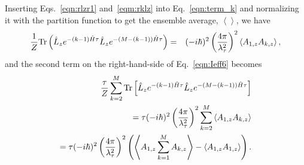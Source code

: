 \documentclass[12pt]{iopart}
\begin{document}
Inserting Eqs.~\ref{eqn:rlzr1} and~\ref{eqm:rklz} into Eq.~\ref{eqn:term_k} and normalizing it with the partition function to get the ensemble average,  $\left< \right>$, we have
\begin{eqnarray}
\frac{1}{Z}{\rm Tr}\left( \hat{L}_ze^{-(k-1)\hat{H}\tau}\hat{L}_ze^{-(M-(k-1))\hat{H}\tau} \right)&=&(-i\hbar)^2\left( \frac{4\pi}{\lambda_\tau^2} \right)^2\left< A_{1,z}A_{k,z} \right>,
\end{eqnarray}
and the second term on the right-hand-side of Eq.~\ref{eqn:Ieff6} becomes
\begin{eqnarray}
\frac{\tau}{Z}\sum_{k=2}^M{\rm Tr}\left[ \hat{L}_ze^{-(k-1)\hat{H}\tau}\hat{L}_z 
e^{-(M-(k-1))\hat{H}\tau} \right]
\nonumber\\
=\tau(-i\hbar)^2\left(\frac{4\pi}{\lambda_\tau^2} \right)^2\sum_{k=2}^M\left<A_{1,z}A_{k,z} \right>\nonumber\\
=\tau(-i\hbar)^2\left(\frac{4\pi}{\lambda_\tau^2} \right)^2
\left( \left<A_{1,z}\sum_{k=1}^MA_{k,z} \right>-\left<A_{1,z}A_{1,z} \right> \right). \label{eqn:2nd_term}
\end{eqnarray}
\end{document}

